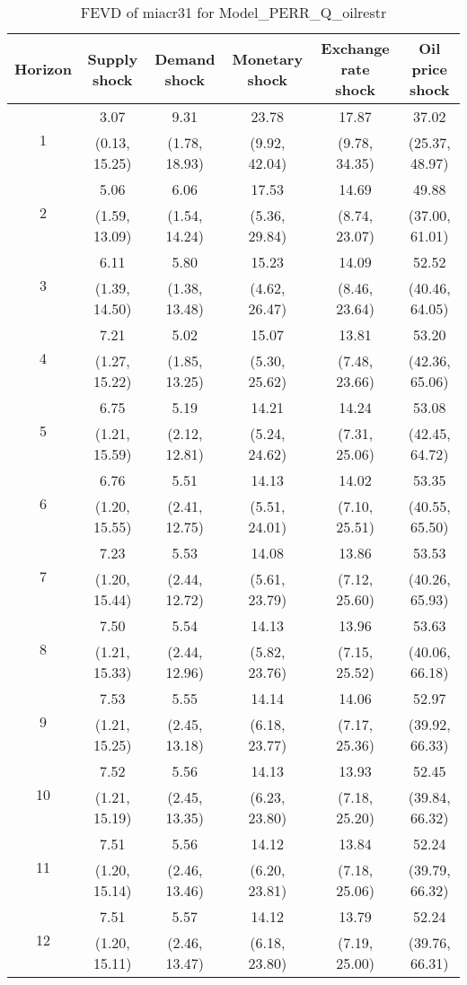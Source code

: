 \documentclass{article}
\begin{document}
\begin{table}
	\footnotesize
	\caption{FEVD of miacr31 for Model_PERR_Q_oilrestr}
	\begin{tabular}{cccccc}
		Horizon & Supply shock & Demand shock & Monetary shock & Exchange rate shock & Oil price shock\\ \hline
		\multirow{2}{*}{1} & 3.07 & 9.31 & 23.78 & 17.87 & 37.02\\
		 & (0.13, 15.25) & (1.78, 18.93) & (9.92, 42.04) & (9.78, 34.35) & (25.37, 48.97)\\
		\multirow{2}{*}{2} & 5.06 & 6.06 & 17.53 & 14.69 & 49.88\\
		 & (1.59, 13.09) & (1.54, 14.24) & (5.36, 29.84) & (8.74, 23.07) & (37.00, 61.01)\\
		\multirow{2}{*}{3} & 6.11 & 5.80 & 15.23 & 14.09 & 52.52\\
		 & (1.39, 14.50) & (1.38, 13.48) & (4.62, 26.47) & (8.46, 23.64) & (40.46, 64.05)\\
		\multirow{2}{*}{4} & 7.21 & 5.02 & 15.07 & 13.81 & 53.20\\
		 & (1.27, 15.22) & (1.85, 13.25) & (5.30, 25.62) & (7.48, 23.66) & (42.36, 65.06)\\
		\multirow{2}{*}{5} & 6.75 & 5.19 & 14.21 & 14.24 & 53.08\\
		 & (1.21, 15.59) & (2.12, 12.81) & (5.24, 24.62) & (7.31, 25.06) & (42.45, 64.72)\\
		\multirow{2}{*}{6} & 6.76 & 5.51 & 14.13 & 14.02 & 53.35\\
		 & (1.20, 15.55) & (2.41, 12.75) & (5.51, 24.01) & (7.10, 25.51) & (40.55, 65.50)\\
		\multirow{2}{*}{7} & 7.23 & 5.53 & 14.08 & 13.86 & 53.53\\
		 & (1.20, 15.44) & (2.44, 12.72) & (5.61, 23.79) & (7.12, 25.60) & (40.26, 65.93)\\
		\multirow{2}{*}{8} & 7.50 & 5.54 & 14.13 & 13.96 & 53.63\\
		 & (1.21, 15.33) & (2.44, 12.96) & (5.82, 23.76) & (7.15, 25.52) & (40.06, 66.18)\\
		\multirow{2}{*}{9} & 7.53 & 5.55 & 14.14 & 14.06 & 52.97\\
		 & (1.21, 15.25) & (2.45, 13.18) & (6.18, 23.77) & (7.17, 25.36) & (39.92, 66.33)\\
		\multirow{2}{*}{10} & 7.52 & 5.56 & 14.13 & 13.93 & 52.45\\
		 & (1.21, 15.19) & (2.45, 13.35) & (6.23, 23.80) & (7.18, 25.20) & (39.84, 66.32)\\
		\multirow{2}{*}{11} & 7.51 & 5.56 & 14.12 & 13.84 & 52.24\\
		 & (1.20, 15.14) & (2.46, 13.46) & (6.20, 23.81) & (7.18, 25.06) & (39.79, 66.32)\\
		\multirow{2}{*}{12} & 7.51 & 5.57 & 14.12 & 13.79 & 52.24\\
		 & (1.20, 15.11) & (2.46, 13.47) & (6.18, 23.80) & (7.19, 25.00) & (39.76, 66.31)\\
	\end{tabular}
\label{tab:fevd-Model_PERR_Q_oilrestr-miacr31}
\end{table}
\end{document}
